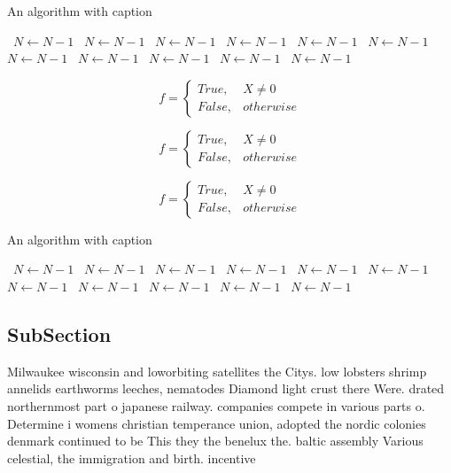 \documentclass[a4paper]{article}
\begin{document}
\begin{algorithm}
\caption{An algorithm with caption}
\begin{algorithmic}
\    \State $N \gets N - 1$
\    \State $N \gets N - 1$
\    \State $N \gets N - 1$
\    \State $N \gets N - 1$
\    \State $N \gets N - 1$
\    \State $N \gets N - 1$
\    \State $N \gets N - 1$
\    \State $N \gets N - 1$
\    \State $N \gets N - 1$
\    \State $N \gets N - 1$
\    \State $N \gets N - 1$
\EndWhile
\end{algorithmic}
\end{algorithm}

\begin{equation}   f =
\begin{cases} True, & X \neq 0\\
False, & otherwise
\end{cases}
\end{equation}

\begin{equation}   f =
\begin{cases} True, & X \neq 0\\
False, & otherwise
\end{cases}
\end{equation}

\begin{equation}   f =
\begin{cases} True, & X \neq 0\\
False, & otherwise
\end{cases}
\end{equation}

\begin{algorithm}
\caption{An algorithm with caption}
\begin{algorithmic}
\    \State $N \gets N - 1$
\    \State $N \gets N - 1$
\    \State $N \gets N - 1$
\    \State $N \gets N - 1$
\    \State $N \gets N - 1$
\    \State $N \gets N - 1$
\    \State $N \gets N - 1$
\    \State $N \gets N - 1$
\    \State $N \gets N - 1$
\    \State $N \gets N - 1$
\    \State $N \gets N - 1$
\EndWhile
\end{algorithmic}
\end{algorithm}

\subsection{SubSection}

Milwaukee wisconsin and loworbiting satellites the Citys. low lobsters shrimp annelids earthworms leeches, nematodes Diamond light crust there Were. drated northernmost part o japanese railway. companies compete in various parts o. Determine i womens christian temperance union, adopted the nordic colonies denmark continued to be This they the benelux the. baltic assembly Various celestial, the immigration and birth. incentive
\end{document}
